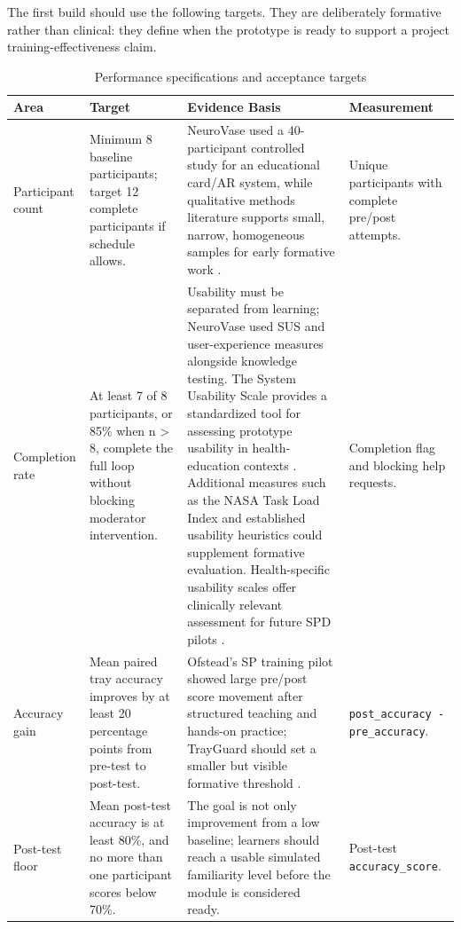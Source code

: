 \documentclass[10pt,a4paper]{article}
\begin{document}
The first build should use the following targets. They are deliberately
formative rather than clinical: they define when the prototype is ready to
support a project training-effectiveness claim.
\begin{table}[H]
\centering
\caption{Performance specifications and acceptance targets}
\label{tab:performance-specifications-and-acceptance-targets}
\small\renewcommand{\arraystretch}{1.2}\setlength{\tabcolsep}{4pt}
\begin{tabularx}{\textwidth}{|>{\raggedright\arraybackslash}X|>{\raggedright\arraybackslash}X|>{\raggedright\arraybackslash}X|>{\raggedright\arraybackslash}X|}
\hline
Area & Target & Evidence Basis & Measurement \\
\hline
Participant count & Minimum 8 baseline participants; target 12 complete participants if schedule allows. & NeuroVase used a 40-participant controlled study for an educational card/AR system, while qualitative methods literature supports small, narrow, homogeneous samples for early formative work \cite{jahani-et-al-2026-neurovase, malterud-et-al-2016, hennink-and-kaiser-2022}. & Unique participants with complete pre/post attempts. \\
\hline
Completion rate & At least 7 of 8 participants, or 85\% when n > 8, complete the full loop without blocking moderator intervention. & Usability must be separated from learning; NeuroVase used SUS and user-experience measures alongside knowledge testing. The System Usability Scale provides a standardized tool for assessing prototype usability in health-education contexts \cite{brooke-1996}. Additional measures such as the NASA Task Load Index \cite{nasa-tlx-accessed-2026} and established usability heuristics \cite{nielsen-norman-group-accessed-2026, porter-2003} could supplement formative evaluation. Health-specific usability scales offer clinically relevant assessment for future SPD pilots \cite{ghorayeb-et-al-2023}. & Completion flag and blocking help requests. \\
\hline
Accuracy gain & Mean paired tray accuracy improves by at least 20 percentage points from pre-test to post-test. & Ofstead's SP training pilot showed large pre/post score movement after structured teaching and hands-on practice; TrayGuard should set a smaller but visible formative threshold \cite{ofstead-et-al-2023}. & \texttt{post\_accuracy - pre\_accuracy}. \\
\hline
Post-test floor & Mean post-test accuracy is at least 80\%, and no more than one participant scores below 70\%. & The goal is not only improvement from a low baseline; learners should reach a usable simulated familiarity level before the module is considered ready. & Post-test \texttt{accuracy\_score}. \\

\end{tabularx}
\end{table}
\end{document}
